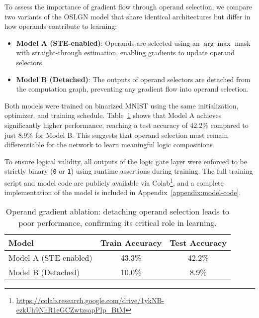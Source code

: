 To assess the importance of gradient flow through operand selection, we compare two variants of the OSLGN model that share identical architectures but differ in how operands contribute to learning:

\begin{itemize}
    \item \textbf{Model A (STE-enabled)}: Operands are selected using an $\arg\max$ mask with straight-through estimation, enabling gradients to update operand selectors.
    \item \textbf{Model B (Detached)}: The outputs of operand selectors are detached from the computation graph, preventing any gradient flow into operand selection.
\end{itemize}

Both models were trained on binarized MNIST using the same initialization, optimizer, and training schedule.  
Table~\ref{tab:operand-detach-results} shows that Model A achieves significantly higher performance, reaching a test accuracy of 42.2\% compared to just 8.9\% for Model B.  
This suggests that operand selection must remain differentiable for the network to learn meaningful logic compositions.

To ensure logical validity, all outputs of the logic gate layer were enforced to be strictly binary (\texttt{0} or \texttt{1}) using runtime assertions during training.  
The full training script and model code are publicly available via Colab\footnote{\url{https://colab.research.google.com/drive/1ykNB-ezkUh9NhR1eGCZwtzsapPIp_BtM}}, and a complete implementation of the model is included in Appendix~\ref{appendix:model-code}.

\begin{table}[H]
    \caption{Operand gradient ablation: detaching operand selection leads to poor performance, confirming its critical role in learning.}
    \label{tab:operand-detach-results}
    \centering
    \begin{tabular}{lcc}
        \toprule
        \textbf{Model} & \textbf{Train Accuracy} & \textbf{Test Accuracy} \\
        \midrule
        Model A (STE-enabled) & 43.3\% & 42.2\% \\
        Model B (Detached)    & 10.0\% & 8.9\% \\
        \bottomrule
    \end{tabular}

\end{table}
